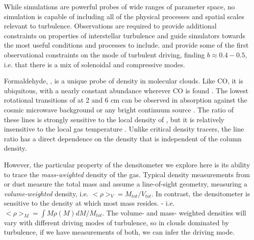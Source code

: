 While simulations are powerful probes of wide ranges of parameter space, no
simulation is capable of including all of the physical processes and spatial
scales relevant to turbulence.  Observations are required to provide additional
constraints on properties of interstellar turbulence and guide simulators
towards the most useful conditions and processes to include.
\citet{Brunt2010c,Kainulainen2012a} and \citet{Kainulainen2013a} provide some
of the first observational constraints on the mode of turbulent driving,
finding $b\approx0.4-0.5$, i.e. that there is a mix of solenoidal and
compressive modes.


Formaldehyde, \formaldehyde, is a unique probe of density in molecular clouds.
Like CO, it is ubiquitous, with a nearly constant abundance wherever CO is
found \citep{Mangum1993a,Tang2013a}.  The lowest rotational transitions of
\ortho at 2 and 6 cm can be observed in absorption against the cosmic microwave
background or any bright continuum source \citep{Ginsburg2011a,Darling2012b}.
The ratio of these lines is strongly sensitive to the local density of \hh, but
it is relatively insensitive to the local gas temperature
\citep{Troscompt2009a,Wiesenfeld2013a}.  Unlike critical density tracers, the
\formaldehyde line ratio has a direct dependence on the density that is
independent of the column density.

However, the particular property of the \formaldehyde densitometer we explore
here is its ability to trace the \emph{mass-weighted} density of the gas.
Typical density measurements from \thirteenco or dust measure the total mass
and assume a line-of-sight geometry, measuring a \emph{volume-weighted}
density, i.e. $<\rho>_V = M_{tot}/V_{tot}$.  In contrast, the \formaldehyde
densitometer is sensitive to the density at which most mass resides.
 - i.e. $<\rho>_M = \int M \rho(M) d M / M_{tot}$.  
The volume- and mass- weighted densities will vary with different driving modes
of turbulence, so in clouds dominated by turbulence, if we have measurements of
both, we can infer the driving mode.

